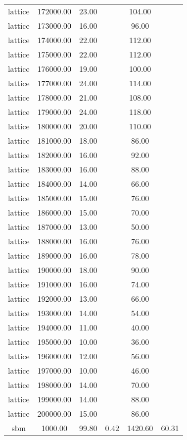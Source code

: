 \begin{table}[ht]
\begin{table}[ht]
\begin{tabular}{|cccccc}
  lattice & 172000.00 & 23.00 &  & 104.00 &  \\ 
  lattice & 173000.00 & 16.00 &  & 96.00 &  \\ 
  lattice & 174000.00 & 22.00 &  & 112.00 &  \\ 
  lattice & 175000.00 & 22.00 &  & 112.00 &  \\ 
  lattice & 176000.00 & 19.00 &  & 100.00 &  \\ 
  lattice & 177000.00 & 24.00 &  & 114.00 &  \\ 
  lattice & 178000.00 & 21.00 &  & 108.00 &  \\ 
  lattice & 179000.00 & 24.00 &  & 118.00 &  \\ 
  lattice & 180000.00 & 20.00 &  & 110.00 &  \\ 
  lattice & 181000.00 & 18.00 &  & 86.00 &  \\ 
  lattice & 182000.00 & 16.00 &  & 92.00 &  \\ 
  lattice & 183000.00 & 16.00 &  & 88.00 &  \\ 
  lattice & 184000.00 & 14.00 &  & 66.00 &  \\ 
  lattice & 185000.00 & 15.00 &  & 76.00 &  \\ 
  lattice & 186000.00 & 15.00 &  & 70.00 &  \\ 
  lattice & 187000.00 & 13.00 &  & 50.00 &  \\ 
  lattice & 188000.00 & 16.00 &  & 76.00 &  \\ 
  lattice & 189000.00 & 16.00 &  & 78.00 &  \\ 
  lattice & 190000.00 & 18.00 &  & 90.00 &  \\ 
  lattice & 191000.00 & 16.00 &  & 74.00 &  \\ 
  lattice & 192000.00 & 13.00 &  & 66.00 &  \\ 
  lattice & 193000.00 & 14.00 &  & 54.00 &  \\ 
  lattice & 194000.00 & 11.00 &  & 40.00 &  \\ 
  lattice & 195000.00 & 10.00 &  & 36.00 &  \\ 
  lattice & 196000.00 & 12.00 &  & 56.00 &  \\ 
  lattice & 197000.00 & 10.00 &  & 46.00 &  \\ 
  lattice & 198000.00 & 14.00 &  & 70.00 &  \\ 
  lattice & 199000.00 & 14.00 &  & 88.00 &  \\ 
  lattice & 200000.00 & 15.00 &  & 86.00 &  \\ 
  sbm & 1000.00 & 99.80 & 0.42 & 1420.60 & 60.31 \\ 

\end{tabular}
\end{table}
\end{table}
